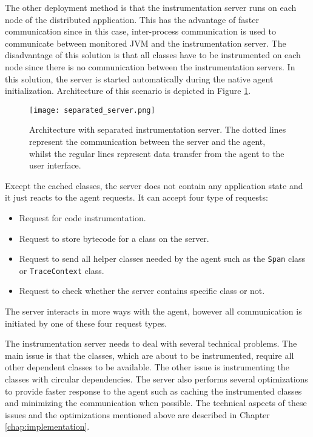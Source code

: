  The other deployment method is that the instrumentation server runs on each node of the distributed application. This has the advantage of faster communication since in this case, inter-process communication is used to communicate between monitored JVM and the instrumentation server. The disadvantage of this solution is that all classes have to be instrumented on each node since there is no communication between the instrumentation servers. In this solution, the server is started automatically during the native agent initialization. Architecture of this scenario is depicted in Figure \ref{fig:separated_server}.
 
 \begin{figure}
 	\centering
 	\texttt{[image: separated\_server.png]}
 	\caption{Architecture with separated instrumentation server. The dotted lines represent the communication between the server and the agent, whilst the regular lines represent data transfer from the agent to the user interface.}
 	\label{fig:separated_server}
 \end{figure}

Except the cached classes, the server does not contain any application state and it just reacts to the agent requests. It can accept four type of requests:
\begin{itemize}
	\item Request for code instrumentation.
	\item Request to store bytecode for a class on the server.
	\item Request to send all helper classes needed by the agent such as the \texttt{Span} class or \texttt{TraceContext} class.
	\item Request to check whether the server contains specific class or not.
\end{itemize}
The server interacts in more ways with the agent, however all communication is initiated by one of these four request types.	

The instrumentation server needs to deal with several technical problems. The main issue is that the classes, which are about to be instrumented, require all other dependent classes to be available. The other issue is instrumenting the classes with circular dependencies. The server also performs several optimizations to provide faster response to the agent such as caching the instrumented classes and minimizing the communication when possible. The technical aspects of these issues and the optimizations mentioned above are described in Chapter \ref{chap:implementation}.
